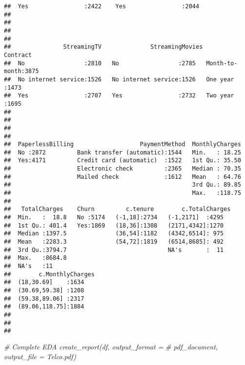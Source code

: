 \documentclass[
]{article}
\newenvironment{Shaded}{\begin{snugshade}}{\end{snugshade}}
\newcommand{\CommentTok}[1]{\textcolor[rgb]{0.56,0.35,0.01}{\textit{#1}}}
\begin{document}
\begin{verbatim}
##  Yes                :2422    Yes                :2044  
##                                                        
##                                                        
##                                                        
##                                                        
##               StreamingTV              StreamingMovies           Contract   
##  No                 :2810   No                 :2785   Month-to-month:3875  
##  No internet service:1526   No internet service:1526   One year      :1473  
##  Yes                :2707   Yes                :2732   Two year      :1695  
##                                                                             
##                                                                             
##                                                                             
##                                                                             
##  PaperlessBilling                   PaymentMethod  MonthlyCharges  
##  No :2872         Bank transfer (automatic):1544   Min.   : 18.25  
##  Yes:4171         Credit card (automatic)  :1522   1st Qu.: 35.50  
##                   Electronic check         :2365   Median : 70.35  
##                   Mailed check             :1612   Mean   : 64.76  
##                                                    3rd Qu.: 89.85  
##                                                    Max.   :118.75  
##                                                                    
##   TotalCharges    Churn         c.tenure        c.TotalCharges
##  Min.   :  18.8   No :5174   (-1,18]:2734   (-1,2171]  :4295  
##  1st Qu.: 401.4   Yes:1869   (18,36]:1308   (2171,4342]:1270  
##  Median :1397.5              (36,54]:1182   (4342,6514]: 975  
##  Mean   :2283.3              (54,72]:1819   (6514,8685]: 492  
##  3rd Qu.:3794.7                             NA's       :  11  
##  Max.   :8684.8                                               
##  NA's   :11                                                   
##        c.MonthlyCharges
##  (18,30.69]    :1634   
##  (30.69,59.38] :1208   
##  (59.38,89.06] :2317   
##  (89.06,118.75]:1884   
##                        
##                        
## 
\end{verbatim}

\begin{Shaded}
\begin{Highlighting}[]
\CommentTok{\# Complete EDA create\_report(df, output\_format =}
\CommentTok{\# \textquotesingle{}pdf\_document\textquotesingle{}, output\_file = \textquotesingle{}Telco.pdf\textquotesingle{})}
\end{Highlighting}
\end{Shaded}
\end{document}
